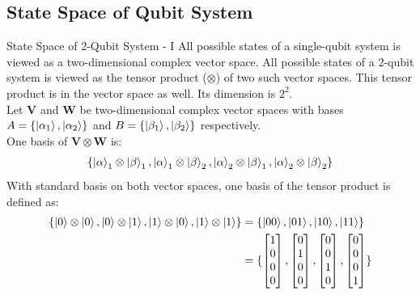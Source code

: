 \documentclass{beamer}
\begin{document}
\subsection{State Space of Qubit System}
\begin{frame}{State Space of 2-Qubit System - I}
  {\tiny
  All possible states of a single-qubit system is viewed as a two-dimensional complex vector space.
  All possible states of a 2-qubit system is viewed as the tensor product ($\otimes$) of two such vector spaces.
  This tensor product is in the vector space as well. Its dimension is $2^2$.\\
  Let $\mathbf{V}$ and $\mathbf{W}$ be two-dimensional complex vector spaces with
  bases $A=\{\ket{\alpha_1}, \ket{\alpha_2}\}$ and $B=\{\ket{\beta_1}, \ket{\beta_2}\}$ respectively. \\
  One basis of $\mathbf{V} \otimes \mathbf{W}$ is:
  \begin{align*}
    \{\ket\alpha_1 \otimes \ket\beta_1,
       \ket\alpha_1 \otimes \ket\beta_2,
       \ket\alpha_2 \otimes \ket\beta_1,
       \ket\alpha_2 \otimes \ket\beta_2 \}
  \end{align*}
  With standard basis on both vector spaces, one basis of the tensor product is defined as:
  \begin{align*}
    \{\ket0 \otimes \ket0, \ket0 \otimes \ket1, \ket1 \otimes \ket0, \ket1 \otimes \ket1 \}
    &= \{\ket{00}, \ket{01}, \ket{10}, \ket{11} \} \\
    &= \{
      \begin{bmatrix} 1 \\ 0 \\ 0 \\ 0 \end{bmatrix},
      \begin{bmatrix} 0 \\ 1 \\ 0 \\ 0 \end{bmatrix},
      \begin{bmatrix} 0 \\ 0 \\ 1 \\ 0 \end{bmatrix},
      \begin{bmatrix} 0 \\ 0 \\ 0 \\ 1 \end{bmatrix}
    \}
  \end{align*}
}
\end{frame}
\end{document}
